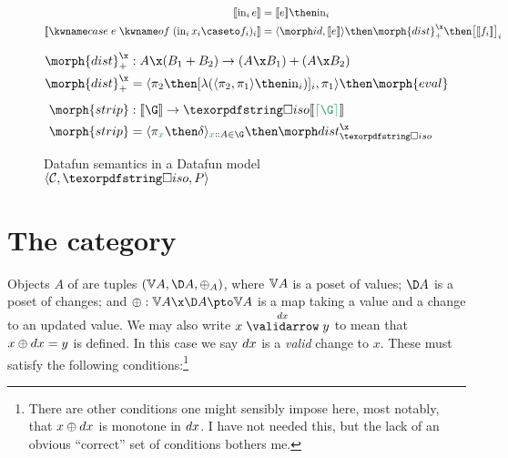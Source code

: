 \documentclass{rntz}\usepackage{fantasy}%
\begin{document}
\begin{figure*}
  \begin{align*}
    \den{\inj i e} &= \den{e} \then \injc_i
    \\
    \den{\ecase{e} (\inj i{x_i} \caseto f_i)_i} &=
    \fork{\id, \den{e}} \then \morph{dist}^\x_+ \then \bigkrof{\den{f_i}}_i
  \end{align*}

  \vspace{.5\baselineskip}

  \begin{align*}
    \morph{dist}^\x_+ &: A \x (B_1 + B_2) \to (A \x B_1) + (A \x B_2)\\
    \morph{dist}^\x_+ &= \fork{\pi_2 \then \krof{\lambda (\fork{\pi_2,\pi_1} \then \injc_i)}_i, \pi_1}
    \then \morph{eval}
    \\[1ex]
    \morph{strip} &: \den\G \to \discof{\den{\stripcxd\G}}\\
    \morph{strip} &= \fork{\pi_{\dvar x} \then \delta}_{\hd x A \in \G} \then \discox
  \end{align*}


  \caption{Datafun semantics in a Datafun model $\tuple{\catC, \disco, \pfin}$}
  \label{fig:general-semantics}
\end{figure*}


\section{The category \CP}
\label{sec:changeposets}

Objects $A$ of \CP{} are tuples $(\vals A, \chgs A, \updfn_A)$, where
%
$\mathbb{V} A$ is a poset of values;
%
$\chgs A$ is a poset of changes;
%
and $\updfn : \vals A \x \chgs A \pto \vals A$ is a  map taking
a value and a change to an updated value.
%
We may also write $\vld{\dx} x y$ to mean that $x \mathbin{\oplus} dx = y$ is defined. In
this case we say $dx$ is a \emph{valid} change to $x$.
%
These must satisfy the following conditions:\footnote{There are other conditions
  one might sensibly impose here, most notably, that $x \mathbin{\oplus} dx$ is monotone in
  $dx$. I have not needed this, but the lack of an obvious ``correct'' set of
  conditions bothers me.}
\end{document}
